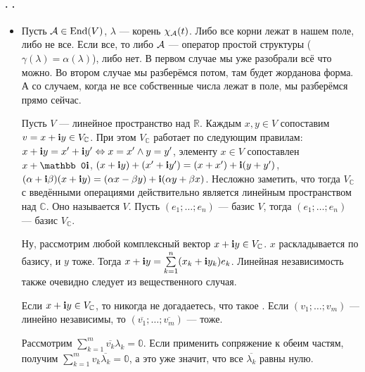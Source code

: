 \documentclass{article}
\begin{document}
    \paragraph{.  .}
    \begin{itemize}
        \item[]
        \begin{Comment}
            Пусть ${\mathcal{A}}\in\operatorname{End}(V)$, $\lambda$ --- корень $\chi_{\mathcal{A}}(t)$. Либо все корни лежат в нашем поле, либо не все. Если все, то либо ${\mathcal{A}}$ --- оператор простой структуры ($\gamma(\lambda)=\alpha(\lambda)$), либо нет. В первом случае мы уже разобрали всё что можно. Во втором случае мы разберёмся потом, там будет жорданова форма. А со случаем, когда не все собственные числа лежат в поле, мы разберёмся прямо сейчас.
        \end{Comment}
        \dfn Пусть $V$ --- линейное пространство над $\mathbb R$. Каждым $x,y\in V$ сопоставим $v=x+{\mathbf i} y\in V_\mathbb C$. При этом $V_\mathbb C$ работает по следующим правилам: $x+{\mathbf i} y=x'+{\mathbf i} y'\Leftrightarrow x=x'\land y=y'$, элементу $x\in V$ сопоставлен $x+\mathbb0\im$, $(x+{\mathbf i} y)+(x'+{\mathbf i} y')=(x+x')+{\mathbf i}(y+y')$, $(\alpha+{\mathbf i}\beta)(x+{\mathbf i} y)=(\alpha x-\beta y)+{\mathbf i}(\alpha y+\beta x)$. Несложно заметить, что тогда $V_\mathbb C$ с введёнными операциями действительно является линейным пространством над $\mathbb C$. Оно называется  $V$.
        \thm Пусть $(e_1;\ldots;e_n)$ --- базис $V$, тогда $(e_1;\ldots;e_n)$ --- базис $V_\mathbb C$.
        \begin{Proof}
            Ну, рассмотрим любой комплексный вектор $x+{\mathbf i} y\in V_\mathbb C$. $x$ раскладывается по базису, и $y$ тоже. Тогда $x+{\mathbf i} y=\sum\limits_{k=1}^n(x_k+{\mathbf i} y_k)e_k$. Линейная независимость также очевидно следует из вещественного случая.
        \end{Proof}
        \dfn Если $x+{\mathbf i} y\in V_\mathbb C$, то никогда не догадаетесь, что такое .
        \thm Если $(v_1;\ldots;v_m)$ --- линейно независимы, то $(\overline{v_1};\ldots;\overline{v_m})$ --- тоже.
        \begin{Proof}
            Рассмотрим $\sum\limits_{k=1}^m\overline{v_k}\lambda_k=\mathbb0$. Если применить сопряжение к обеим частям, получим $\sum\limits_{k=1}^mv_k\overline{\lambda_k}=\mathbb0$, а это уже значит, что все $\overline{\lambda_k}$ равны нулю.

\end{Proof}
\end{itemize}
\end{document}
